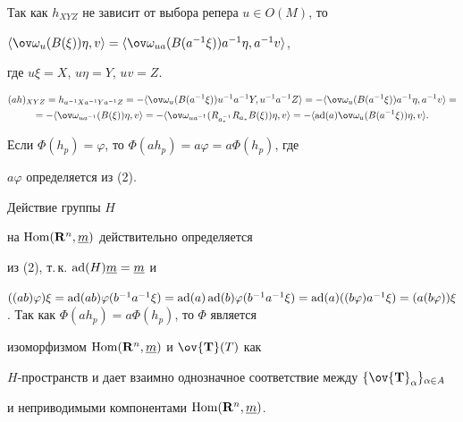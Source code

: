 \begin{pf} 


Так как $h_{X Y Z}$ не зависит от выбора репера $u\in O(M)$, то 


$\la\ov\omega_u(B(\xi))\eta,v\ra= \la\ov\omega_{u 


a}(B(a^{-1}\xi))a^{-1}\eta,a^{-1}v\ra$, 


где $u\xi=X$, $u\eta=Y$, $u v=Z$. 


\begin{multline*} 


(a h)_{X Y Z}=h_{a^{-1}X a^{-1}Y a^{-1}Z}= 


-\la\ov\omega_u(B(a^{-1}\xi))u^{-1}a^{-1}Y,u^{-1}a^{-1}Z\ra= 


-\la\ov\omega_u(B(a^{-1}\xi))a^{-1}\eta,a^{-1}v\ra= \\ 


% 


=-\la\ov\omega_{u a^{-1}}(B(\xi))\eta,v\ra= 


-\la\ov\omega_{u a^{-1}}(R_{a^{-1}_*}R_{a_*}B(\xi)) 


\eta,v\ra=-\la\ad(a)\ov\omega_u(B(a^{-1}\xi))\eta,v\ra. 


\end{multline*} 


Если $\Phi(h_p)=\varphi$, то $\Phi(a h_p)=a\varphi=a\Phi(h_p)$, где 


$a\varphi$ определяется из (2). 


Действие группы $H$ 


на $\operatorname{Hom}(\bold R^n,\underline m)$ действительно определяется 


из (2), т.\,к. $\operatorname{ad}(H)\underline m=\underline m$ и 


$((a b)\varphi)\xi=\ad(a b)\varphi(b^{-1}a^{-1}\xi)= 


\ad(a)\ad(b)\varphi(b^{-1}a^{-1}\xi)= \ad(a)((b\varphi)a^{-1}\xi)= 


(a(b\varphi))\xi$. Так как $\Phi(a h_p)=a\Phi(h_p)$, то $\Phi$ является 


изоморфизмом $\operatorname{Hom}(\bold R^n,\underline m)$ и $\ov{\bold T}(T)$ как 


$H$-пространств и дает взаимно однозначное соответствие между $\{\ov{\bold 


T}_\alpha\}_{\alpha\in A}$ 


и неприводимыми компонентами $\operatorname{Hom}(\bold R^n,\underline m)$. 


\end{pf}


 


